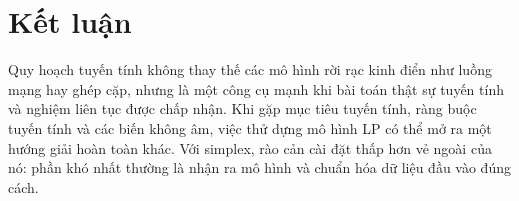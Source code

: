 \documentclass[11pt]{article}
\begin{document}
\section{Kết luận}

Quy hoạch tuyến tính không thay thế các mô hình rời rạc kinh điển như luồng
mạng hay ghép cặp, nhưng là một công cụ mạnh khi bài toán thật sự tuyến tính
và nghiệm liên tục được chấp nhận. Khi gặp mục tiêu tuyến tính, ràng buộc
tuyến tính và các biến không âm, việc thử dựng mô hình LP có thể mở ra một
hướng giải hoàn toàn khác. Với simplex, rào cản cài đặt thấp hơn vẻ ngoài
của nó: phần khó nhất thường là nhận ra mô hình và chuẩn hóa dữ liệu đầu vào
đúng cách.
\end{document}
